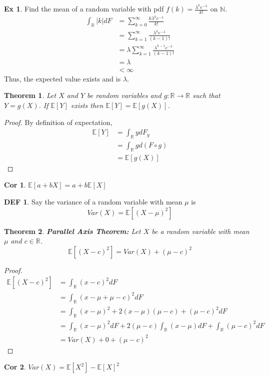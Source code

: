 \documentclass{article}
\newtheorem{theorem}{Theorem}
\theoremstyle{definition}\newtheorem{definition}{DEF}
\theoremstyle{definition}\newtheorem{example}{Ex}
\theoremstyle{lemma}\newtheorem{lemma}{Lemma}
\theoremstyle{corrolary}\newtheorem{corrolary}{Cor}
\begin{document}
\begin{example}
Find the mean of a random variable with pdf $f(k)=\frac{\lambda^k e^{-\lambda}}{k!}$ on $\mathbb{N}$.
\begin{align*}
\int_\mathbb{R} |k| dF &= \sum_{k=0}^\infty \frac{k\lambda^k e^{-\lambda}}{k!} \\
&= \sum_{k=1}^\infty \frac{\lambda^k e^{-\lambda}}{(k-1)!}\\
&= \lambda \sum_{k=1}^\infty \frac{\lambda^{k-1} e^{-\lambda}}{(k-1)!}\\
&= \lambda\\
&<\infty
\end{align*}
Thus, the expected value exists and is $\lambda$.
\end{example}

\begin{theorem}
Let $X$ and $Y$ be random variables and $g: \mathbb{R} \rightarrow \mathbb{R}$ such that $Y=g(X)$.
If $\mathbb{E}[Y]$ exists then $\mathbb{E}[Y]=\mathbb{E}[g(X)]$.
\end{theorem}
\begin{proof}
By definition of expectation,
\begin{align*}
\mathbb{E}[Y] &= \int_\mathbb{R} y dF_y\\
&= \int_\mathbb{R} g d(F \circ g)\\
&= \mathbb{E}[g(X)]
\end{align*}
\end{proof}
\begin{corrolary}
$\mathbb{E}[a+bX] = a + b\mathbb{E}[X]$
\end{corrolary}

\begin{definition}
Say the variance of a random variable with mean $\mu$ is
\begin{equation}
Var(X)=\mathbb{E}[(X-\mu)^2]
\end{equation}
\end{definition}

\begin{theorem}
\textbf{Parallel Axis Theorem:}
Let $X$ be a random variable with mean $\mu$ and $c\in \mathbb{R}$.
\begin{equation}
\mathbb{E}[(X-c)^2] = Var(X) + (\mu - c)^2
\end{equation}
\end{theorem}
\begin{proof}
\begin{align*}
\mathbb{E}[(X-c)^2] &= \int_\mathbb{R} (x-c)^2 dF\\
&= \int_\mathbb{R} (x-\mu +\mu -c)^2 dF\\
&= \int_\mathbb{R} (x-\mu )^2 + 2(x-\mu )(\mu -c) + (\mu -c)^2 dF\\
&= \int_\mathbb{R} (x-\mu )^2 dF + 2 (\mu -c) \int_\mathbb{R} (x-\mu ) dF + \int_\mathbb{R}(\mu -c)^2 dF\\
&= Var(X) + 0 +(\mu -c)^2
\end{align*}
\end{proof}
\begin{corrolary}
$Var(X) = \mathbb{E}[X^2] - \mathbb{E}[X]^2$
\end{corrolary}
\end{document}
